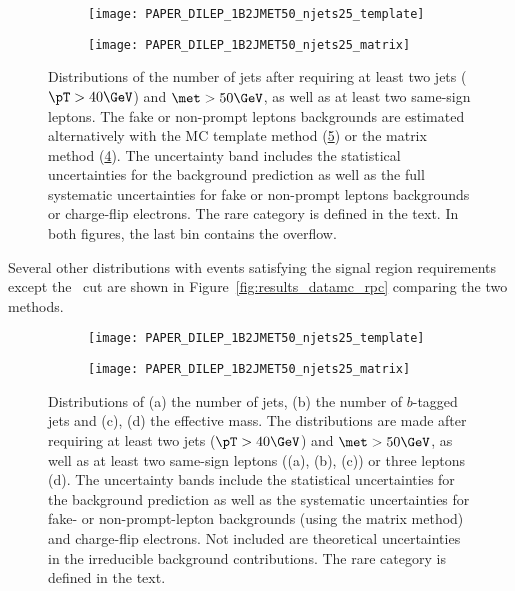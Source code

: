 \begin{figure}[htb!]
\begin{subfigure}[t]{0.49\textwidth}\texttt{[image: PAPER\_DILEP\_1B2JMET50\_njets25\_template]}\caption{}\label{fig:VR1b2j_MxM}\end{subfigure}
\begin{subfigure}[t]{0.49\textwidth}\texttt{[image: PAPER\_DILEP\_1B2JMET50\_njets25\_matrix]}\caption{}\label{fig:VR1b2j_MCT}\end{subfigure}
\caption{
Distributions of the number of jets after requiring at least two jets ($\pT> 40 \GeV$) and $\met> 50 \GeV$, 
as well as at least two same-sign leptons. 
The fake or non-prompt leptons backgrounds are estimated alternatively with the MC template method (\ref{fig:VR1b2j_MCT}) or the matrix method (\ref{fig:VR1b2j_MxM}). 
The uncertainty band includes the statistical uncertainties for the background prediction as well as the
full systematic uncertainties for fake or non-prompt leptons backgrounds or charge-flip electrons. 
The rare category is defined in the text. In both figures, the last bin contains the overflow.
}
\label{fig:VR1b2j}
\end{figure}

Several other distributions with events satisfying the signal region 
requirements except the \met\ cut are shown in 
Figure~\ref{fig:results_datamc_rpc} comparing the two methods. 

\begin{figure}[htb!]
\begin{subfigure}[t]{0.49\textwidth}\texttt{[image: PAPER\_DILEP\_1B2JMET50\_njets25\_template]}\caption{}\label{fig:VR1b2j_MxM}\end{subfigure}
\begin{subfigure}[t]{0.49\textwidth}\texttt{[image: PAPER\_DILEP\_1B2JMET50\_njets25\_matrix]}\caption{}\label{fig:VR1b2j_MCT}\end{subfigure}
\caption{
Distributions of (a) the number of jets, (b) the number of $b$-tagged jets and (c), (d) the effective mass. The distributions are made 
after requiring at least two jets ($\pT>40 \GeV$) and $\met>50 \GeV$, as well as at least two same-sign leptons ((a), (b), (c)) 
or three leptons (d). The uncertainty bands include the statistical uncertainties for the background prediction as well as the 
systematic uncertainties for fake- or non-prompt-lepton backgrounds (using the matrix method) and charge-flip electrons. Not included
are theoretical uncertainties in the irreducible background contributions.
The rare category is defined in the text.}
\label{fig:Bkg_distribs} 
\end{figure} 



